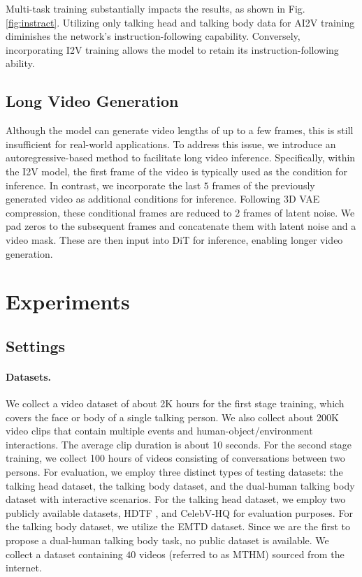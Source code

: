 \documentclass{article}
\begin{document}
Multi-task training substantially impacts the results, as shown in Fig.\ref{fig:instract}. Utilizing only talking head and talking body data for AI2V training diminishes the network's instruction-following capability. Conversely, incorporating I2V training allows the model to retain its instruction-following ability.

\subsection{Long Video Generation}
\label{sec:longgen}

Although the model can generate video lengths of up to a few frames, this is still insufficient for real-world applications. To address this issue, we introduce an autoregressive-based method to facilitate long video inference. Specifically, within the I2V model, the first frame of the video is typically used as the condition for inference. In contrast, we incorporate the last $5$ frames of the previously generated video as additional conditions for inference. Following 3D VAE compression, these conditional frames are reduced to $2$ frames of latent noise. We pad zeros to the subsequent frames and concatenate them with latent noise and a video mask. These are then input into DiT for inference, enabling longer video generation.

\section{Experiments}

\subsection{Settings}

\paragraph{Datasets.} We collect a video dataset of about 2K hours for the first stage training, which covers the face or body of a single talking person. We also collect about 200K video clips that contain multiple events and human-object/environment interactions. The average clip duration is about 10 seconds. For the second stage training, we collect 100 hours of videos consisting of conversations between two persons. 
For evaluation, we employ three distinct types of testing datasets: the talking head dataset, the talking body dataset, and the dual-human talking body dataset with interactive scenarios.
For the talking head dataset, we employ two publicly available datasets, HDTF \cite{zhang2021flow}, and CelebV-HQ \cite{zhu2022celebvhq} for evaluation purposes. For the talking body dataset, we utilize the EMTD \cite{meng2024echomimicv2} dataset. Since we are the first to propose a dual-human talking body task, no public dataset is available. We collect a dataset containing $40$ videos (referred to as MTHM) sourced from the internet.
\end{document}
